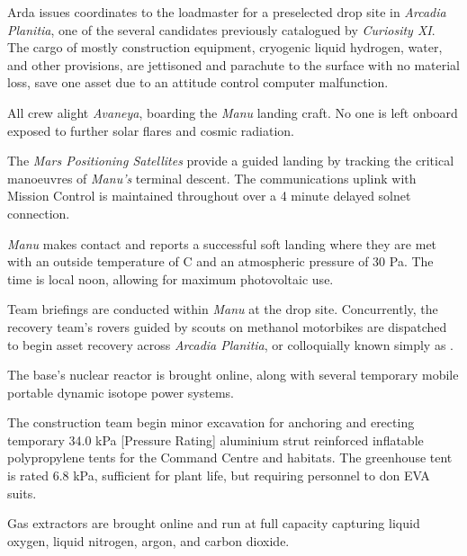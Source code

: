 

Arda issues coordinates to the loadmaster for a preselected drop site in {\it Arcadia Planitia}, one of the several candidates previously catalogued by {\it Curiosity XI}. The cargo of mostly construction equipment, cryogenic liquid hydrogen, water, and other provisions, are jettisoned and parachute to the surface with no material loss, save one asset due to an attitude control computer malfunction.
\StopTimelineDate

All crew alight {\it Avaneya}, boarding the {\it Manu} landing craft. No one is left onboard exposed to further solar flares and cosmic radiation.

The {\it Mars Positioning Satellites} provide a guided landing by tracking the critical manoeuvres of {\it Manu's} terminal descent. The communications uplink with Mission Control is maintained throughout over a 4 minute delayed solnet connection.

{\it Manu} makes contact and reports a successful soft landing where they are met with an outside temperature of C and an atmospheric pressure of 30 Pa. The time is local noon, allowing for maximum photovoltaic use.

Team briefings are conducted within {\it Manu} at the drop site. Concurrently, the recovery team's rovers guided by scouts on methanol motorbikes are dispatched to begin asset recovery across {\it Arcadia Planitia}, or colloquially known simply as .

The base's nuclear reactor is brought online, along with several temporary mobile portable dynamic isotope power systems.

The construction team begin minor excavation for anchoring and erecting temporary 34.0 kPa [Pressure Rating] aluminium strut reinforced inflatable polypropylene tents for the Command Centre and habitats. The greenhouse tent is rated 6.8 kPa, sufficient for plant life, but requiring personnel to don EVA suits.
\StopTimelineDate

Gas extractors are brought online and run at full capacity capturing liquid oxygen, liquid nitrogen, argon, and carbon dioxide. 

